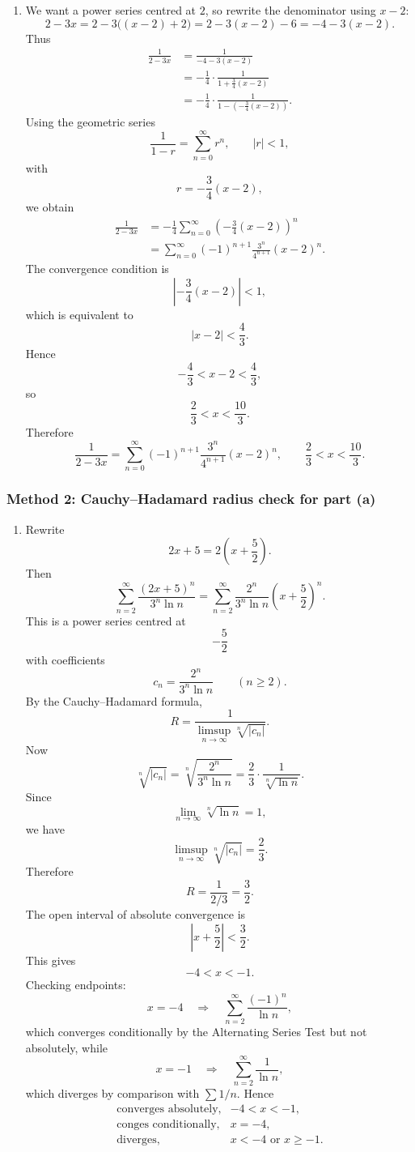 \documentclass[12pt]{article}
\begin{document}
\begin{enumerate}[label=(\alph*)]
\item We want a power series centred at $2$, so rewrite the denominator using $x-2$:
\[
2-3x
=
2-3\bigl((x-2)+2\bigr)
=
2-3(x-2)-6
=
-4-3(x-2).
\]
Thus
\begin{align*}
\frac1{2-3x}
&=
\frac1{-4-3(x-2)}\\
&=
-\frac14\cdot \frac1{1+\frac34(x-2)}\\
&=
-\frac14\cdot \frac1{1-\left(-\frac34(x-2)\right)}.
\end{align*}
Using the geometric series
\[
\frac1{1-r}=\sum_{n=0}^{\infty}r^n,
\qquad |r|<1,
\]
with
\[
r=-\frac34(x-2),
\]
we obtain
\begin{align*}
\frac1{2-3x}
&=
-\frac14
\sum_{n=0}^{\infty}
\left(-\frac34(x-2)\right)^n\\
&=
\sum_{n=0}^{\infty}
(-1)^{n+1}\frac{3^n}{4^{n+1}}(x-2)^n.
\end{align*}
The convergence condition is
\[
\left|-\frac34(x-2)\right|<1,
\]
which is equivalent to
\[
|x-2|<\frac43.
\]
Hence
\[
-\frac43<x-2<\frac43,
\]
so
\[
\frac23<x<\frac{10}{3}.
\]
Therefore
\[
\boxed{
\frac1{2-3x}
=
\sum_{n=0}^{\infty}
(-1)^{n+1}\frac{3^n}{4^{n+1}}(x-2)^n,
\qquad
\frac23<x<\frac{10}{3}.}
\]
\end{enumerate}

\newpage
\subsubsection{Method 2: Cauchy--Hadamard radius check for part (a)}

\begin{enumerate}[label=(\alph*)]
\item Rewrite
\[
2x+5=2\left(x+\frac52\right).
\]
Then
\[
\sum_{n=2}^{\infty}\frac{(2x+5)^n}{3^n\ln n}
=
\sum_{n=2}^{\infty}
\frac{2^n}{3^n\ln n}
\left(x+\frac52\right)^n.
\]
This is a power series centred at
\[
-\frac52
\]
with coefficients
\[
c_n=\frac{2^n}{3^n\ln n}
\qquad(n\ge2).
\]
By the Cauchy--Hadamard formula,
\[
R=
\frac{1}{\limsup\limits_{n\to\infty}\sqrt[n]{|c_n|}}.
\]
Now
\[
\sqrt[n]{|c_n|}
=
\sqrt[n]{\frac{2^n}{3^n\ln n}}
=
\frac23\cdot \frac1{\sqrt[n]{\ln n}}.
\]
Since
\[
\lim_{n\to\infty}\sqrt[n]{\ln n}=1,
\]
we have
\[
\limsup_{n\to\infty}\sqrt[n]{|c_n|}
=
\frac23.
\]
Therefore
\[
R=\frac{1}{2/3}=\frac32.
\]
The open interval of absolute convergence is
\[
\left|x+\frac52\right|<\frac32.
\]
This gives
\[
-4<x<-1.
\]
Checking endpoints:
\[
x=-4
\quad\Longrightarrow\quad
\sum_{n=2}^{\infty}\frac{(-1)^n}{\ln n},
\]
which converges conditionally by the Alternating Series Test but not absolutely, while
\[
x=-1
\quad\Longrightarrow\quad
\sum_{n=2}^{\infty}\frac1{\ln n},
\]
which diverges by comparison with $\sum 1/n$. Hence
\[
\boxed{
\begin{array}{ll}
\text{converges absolutely}, & -4<x<-1,\\[0.2em]
\text{conges conditionally}, & x=-4,\\[0.2em]
\text{diverges}, & x<-4\text{ or }x\ge -1.
\end{array}}
\]
\end{enumerate}
\end{document}
